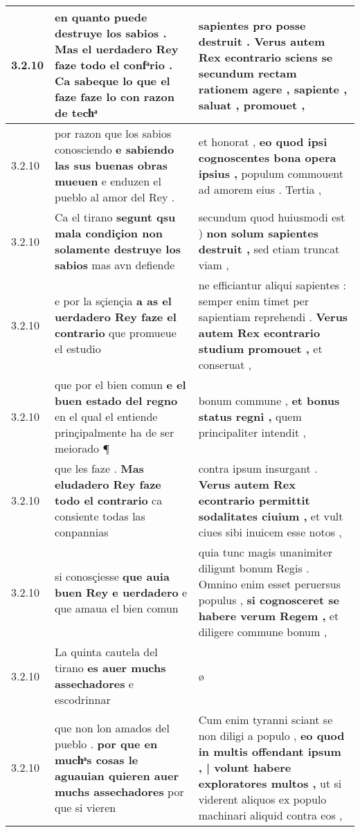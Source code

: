 \begin{tabular}{|p{1cm}|p{6.5cm}|p{6.5cm}|}
3.2.10 & en quanto puede destruye los sabios . \textbf{ Mas el uerdadero Rey faze todo el confͣrio . } Ca sabeque lo que el faze faze lo con razon de techͣ & sapientes pro posse destruit . \textbf{ Verus autem Rex econtrario sciens se secundum rectam rationem agere , } sapiente , saluat , promouet , \\\hline
3.2.10 & por razon que los sabios conosciendo \textbf{ e sabiendo las sus buenas obras mueuen } e enduzen el pueblo al amor del Rey . & et honorat , \textbf{ eo quod ipsi cognoscentes bona opera ipsius , } populum commouent ad amorem eius . Tertia , \\\hline
3.2.10 & Ca el tirano \textbf{ segunt qsu mala condiçion non solamente destruye los sabios } mas avn defiende & secundum quod huiusmodi est ) \textbf{ non solum sapientes destruit , } sed etiam truncat viam , \\\hline
3.2.10 & e por la sçiençia \textbf{ a as el uerdadero Rey faze el contrario } que promueue el estudio & ne efficiantur aliqui sapientes : semper enim timet per sapientiam reprehendi . \textbf{ Verus autem Rex econtrario studium promouet , } et conseruat , \\\hline
3.2.10 & que por el bien comun \textbf{ e el buen estado del regno } en el qual el entiende prinçipalmente ha de ser meiorado ¶ & bonum commune , \textbf{ et bonus status regni , } quem principaliter intendit , \\\hline
3.2.10 & que les faze . \textbf{ Mas eludadero Rey faze todo el contrario } ca consiente todas las conpannias & contra ipsum insurgant . \textbf{ Verus autem Rex econtrario permittit sodalitates ciuium , } et vult ciues sibi inuicem esse notos , \\\hline
3.2.10 & si conosçiesse \textbf{ que auia buen Rey e uerdadero } e que amaua el bien comun & quia tunc magis unanimiter diligunt bonum Regis . Omnino enim esset peruersus populus , \textbf{ si cognosceret se habere verum Regem , } et diligere commune bonum , \\\hline
3.2.10 & La quinta cautela del tirano \textbf{ es auer muchs assechadores } e escodrinnar & ø \\\hline
3.2.10 & que non lon amados del pueblo . \textbf{ por que en muchͣs cosas le aguauian quieren auer muchs assechadores } por que si vieren & Cum enim tyranni sciant se non diligi a populo , \textbf{ eo quod in multis offendant ipsum , | volunt habere exploratores multos , } ut si viderent aliquos ex populo machinari aliquid contra eos , \\\hline

\end{tabular}
